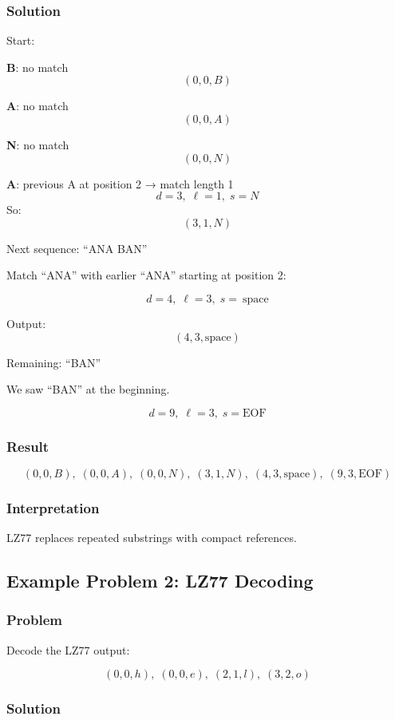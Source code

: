 \documentclass{AnantDocumentation}
\begin{document}
\subsubsection*{Solution}

Start:

\textbf{B}: no match  
\[
(0,0,B)
\]

\textbf{A}: no match  
\[
(0,0,A)
\]

\textbf{N}: no match  
\[
(0,0,N)
\]

\textbf{A}: previous A at position 2 → match length 1
\[
d = 3,\;\ell = 1,\; s = N
\]
So:
\[
(3,1,N)
\]

Next sequence: “ANA BAN”

Match “ANA” with earlier “ANA” starting at position 2:

\[
d=4,\;\ell=3,\;s=\ \text{space}
\]

Output:
\[
(4,3,\text{space})
\]

Remaining: “BAN”

We saw “BAN” at the beginning.

\[
d=9,\;\ell=3,\;s=\text{EOF}
\]

\subsubsection*{Result}

\[
(0,0,B),\; (0,0,A),\; (0,0,N),\; (3,1,N),\; (4,3,\text{space}),\; (9,3,\text{EOF})
\]

\subsubsection*{Interpretation}

LZ77 replaces repeated substrings with compact references.

\subsection{Example Problem 2: LZ77 Decoding}

\subsubsection*{Problem}

Decode the LZ77 output:

\[
(0,0,h),\;
(0,0,e),\;
(2,1,l),\;
(3,2,o)
\]

\subsubsection*{Solution}
\end{document}
